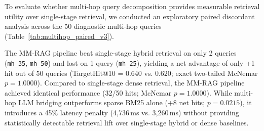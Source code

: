 \documentclass[conference]{IEEEtran}
\begin{document}
To evaluate whether multi-hop query decomposition provides measurable retrieval utility over single-stage retrieval, we conducted an exploratory paired discordant analysis across the 50 diagnostic multi-hop queries (Table~\ref{tab:multihop_paired_v3}).

\begin{table}[t]
\centering
\small
\caption{Exact paired discordant case analysis and two-tailed McNemar tests across the 50 diagnostic multi-hop queries. Comparison of Multi-Hop LLM Bridging against Single-Stage Hybrid, Single-Stage Dense, and Sparse BM25 baselines. While LLM bridging outperforms sparse BM25 alone (+8 net hits, $p = 0.0215$), it yields no statistically detectable retrieval improvement over single-stage hybrid (+1 net hit, $p = 1.000$) or single-stage dense (identical 32/50 hits, $p = 1.000$).}
\label{tab:multihop_paired_v3}
\end{table}

The MM-RAG pipeline beat single-stage hybrid retrieval on only 2 queries (\texttt{mh\_35}, \texttt{mh\_50}) and lost on 1 query (\texttt{mh\_25}), yielding a net advantage of only +1 hit out of 50 queries (TargetHit@10 = 0.640 vs. 0.620; exact two-tailed McNemar $p = 1.0000$). Compared to single-stage dense retrieval, the MM-RAG pipeline achieved identical performance (32/50 hits; McNemar $p = 1.0000$). While multi-hop LLM bridging outperforms sparse BM25 alone (+8 net hits; $p = 0.0215$), it introduces a 45\% latency penalty (4,736\,ms vs. 3,260\,ms) without providing statistically detectable retrieval lift over single-stage hybrid or dense baselines.
\end{document}
